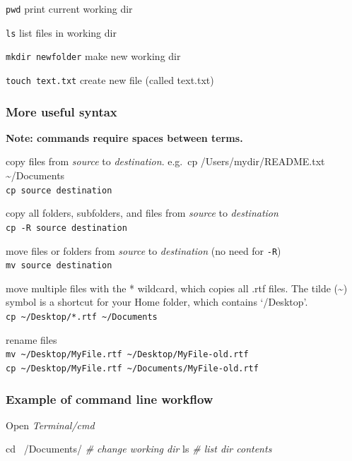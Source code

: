 \documentclass[10,portrait]{article}
\newenvironment{Shaded}{\begin{snugshade}}{\end{snugshade}}
\newcommand{\CommentTok}[1]{\textcolor[rgb]{0.56,0.35,0.01}{\textit{#1}}}
\newcommand{\FunctionTok}[1]{\textcolor[rgb]{0.00,0.00,0.00}{#1}}
\newcommand{\BuiltInTok}[1]{#1}
\newcommand{\NormalTok}[1]{#1}
\begin{document}
\texttt{pwd} print current working dir

\texttt{ls} list files in working dir

\texttt{mkdir\ newfolder} make new working dir

\texttt{touch\ text.txt} create new file (called text.txt)

\subsubsection{More useful syntax}\label{more-useful-syntax}

\textbf{Note: commands require spaces between terms.}

copy files from \emph{source} to \emph{destination}. e.g.~cp
/Users/mydir/README.txt \textasciitilde{}/Documents\\
\texttt{cp\ source\ destination}

copy all folders, subfolders, and files from \emph{source} to
\emph{destination}\\
\texttt{cp\ -R\ source\ destination}

move files or folders from \emph{source} to \emph{destination} (no need
for \texttt{-R})\\
\texttt{mv\ source\ destination}

move multiple files with the * wildcard, which copies all .rtf files.
The tilde (\textasciitilde{}) symbol is a shortcut for your Home folder,
which contains `/Desktop'.\\
\texttt{cp\ \textasciitilde{}/Desktop/*.rtf\ \textasciitilde{}/Documents}

rename files\\
\texttt{mv\ \textasciitilde{}/Desktop/MyFile.rtf\ \textasciitilde{}/Desktop/MyFile-old.rtf}\\
\texttt{cp\ \textasciitilde{}/Desktop/MyFile.rtf\ \textasciitilde{}/Documents/MyFile-old.rtf}

\subsubsection{Example of command line
workflow}\label{example-of-command-line-workflow}

Open \emph{Terminal/cmd}

\begin{Shaded}
\begin{Highlighting}[]
\BuiltInTok{cd}\NormalTok{ ~/Documents/ }\CommentTok{# change working dir}
\FunctionTok{ls} \CommentTok{# list dir contents      }
\end{Highlighting}
\end{Shaded}
\end{document}
